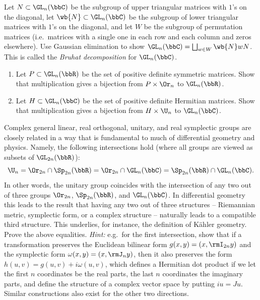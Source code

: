 \begin{xca}
    Let $N\subset \GL_n(\bbC)$ be the subgroup of upper triangular matrices with $1$'s on the diagonal, let $\wb{N}\subset \GL_n(\bbC)$ be the subgroup of lower triangular matrices with $1$'s on the diagonal, and let $W$ be the subgroup of permutation matrices (i.e.~matrices with a single one in each row and each column and zeros elsewhere). Use Gaussian elimination to show $\GL_n(\bbC)=\bigsqcup_{w\in W}\wb{N}wN$. This is called the \emph{Bruhat decomposition} for $\GL_n(\bbC)$.
\end{xca}

\begin{xca}
    \begin{enumerate}[label=(\alph*)]
        \item Let $P\subset \GL_n(\bbR)$ be the set of positive definite symmetric matrices. Show that multiplication gives a bijection from $P\times \Or_n$ to $\GL_n(\bbR)$.
        \item Let $H\subset \GL_n(\bbC)$ be the set of positive definite Hermitian matrices. Show that multiplication gives a bijection from $H\times\U_n$ to $\GL_n(\bbC)$.
    \end{enumerate}
\end{xca}

\begin{xca}
    Complex general linear, real orthogonal, unitary, and real symplectic groups are closely related in a way that is fundamental to much of differential geometry and physics. Namely, the following intersections hold (where all groups are viewed as subsets of $\GL_{2n}(\bbR)$):
    \[\U_n=\Or_{2n}\cap \Sp_{2n}(\bbR)=\Or_{2n}\cap \GL_{n}(\bbC)=\Sp_{2n}(\bbR)\cap \GL_{n}(\bbC). \]
    In other words, the unitary group coincides with the intersection of any two out of three groups $\Or_{2n}$, $\Sp_{2n}(\bbR)$, and $\GL_{n}(\bbC)$. In differential geometry this leads to the result that having any two out of three structures -- Riemannian metric, symplectic form, or a complex structure -- naturally leads to a compatible third structure. This underlies, for instance, the definition of K\"ahler geometry. Prove the above equalities. \emph{Hint:} e.g.~for the first intersection, show that if a transformation preserves the Euclidean bilinear form $g(x,y)=(x,\rmI_{2n}y)$ and the symplectic form $\omega(x,y)=(x,\rmJ_ny)$, then it also preserves the form $h(u,v)=g(u,v)+i\omega(u,v)$, which defines a Hermitian dot product if we let the first $n$ coordinates be the real parts, the last $n$ coordinates the imaginary parts, and define the structure of a complex vector space by putting $iu=Ju$. Similar constructions also exist for the other two directions.
\end{xca}







